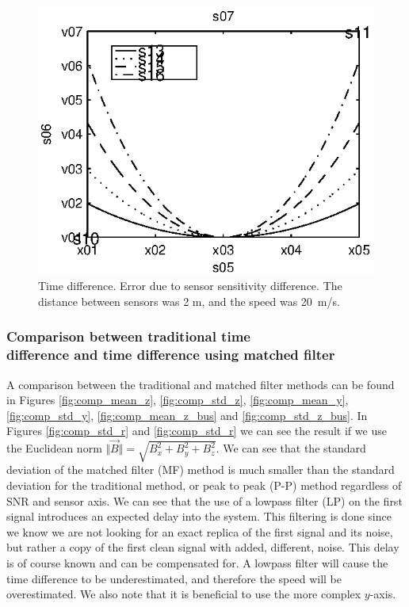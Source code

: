 \begin{figure}[!thb]
  \centering
  \begin{minipage}{0.45\linewidth}
  \centering
  
   \includegraphics[width=\linewidth]{images/vest_eps}
  \caption[Time difference. Error due to sensor sensitivity difference]{Time difference. Error due to sensor sensitivity difference. The distance between sensors was 2 m, and the speed was 20~m/s.}
  \label{fig:vest_eps}
  \end{minipage}
\end{figure}

\subsubsection[Comparison between traditional time difference and time difference using matched filter]{Comparison between traditional time\\difference and time difference using matched filter}

A comparison between the traditional and matched filter methods can be found in Figures \ref{fig:comp_mean_z}, \ref{fig:comp_std_z}, \ref{fig:comp_mean_y}, \ref{fig:comp_std_y}, \ref{fig:comp_mean_z_bus} and \ref{fig:comp_std_z_bus}. In Figures \ref{fig:comp_std_r} and \ref{fig:comp_std_r} we can see the result if we use the Euclidean norm $\Vert \vec{B} \Vert= \sqrt{B_x^2+B_y^2+B_z^2}$. We can see that the standard deviation of the matched filter (MF) method is much smaller than the standard deviation for the traditional method, or peak to peak (P-P) method regardless of SNR and sensor axis. We can see that the use of a lowpass filter (LP) on the first signal introduces an expected delay into the system. This filtering is done since we know we are not looking for an exact replica of the first signal and its noise, but rather a copy of the first clean signal with added, different, noise. This delay is of course known and can be compensated for. A lowpass filter will cause the time difference to be underestimated, and therefore the speed will be overestimated. We also note that it is beneficial to use the more complex $y$-axis.

